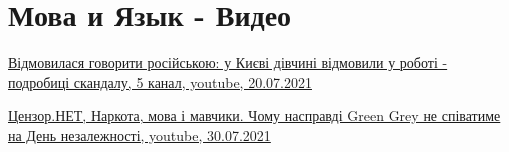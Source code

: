  
 
 
 
 
\section{Мова и Язык - Видео}

\href{https://www.youtube.com/watch?v=swb22_gGNMo}{%
Відмовилася говорити російською: у Києві дівчині відмовили у роботі - подробиці скандалу,%
5 канал, youtube, 20.07.2021%
}

\href{https://www.youtube.com/watch?v=7C4h6jjCyFc}{%
Цензор.НЕТ, Наркота, мова і мавчики. Чому насправді Green Grey не співатиме на День незалежності, youtube, 30.07.2021%
}
